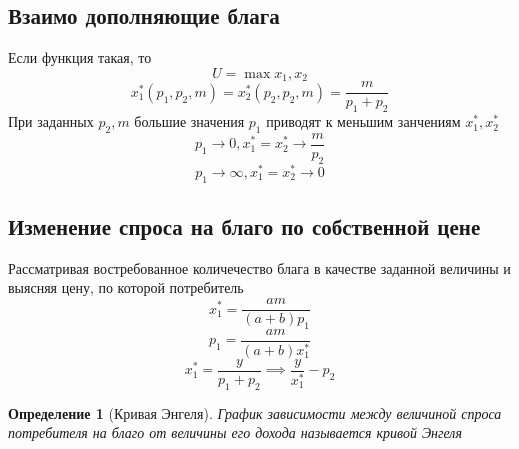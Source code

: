 \documentclass[14pt]{extarticle}
\newtheorem{definition}{Определение}
\begin{document}
 \subsection{Взаимо дополняющие блага }
 Если функция такая, то
 \begin{equation}
	 U = \max{x_1,x_2}
 \end{equation} 
 \begin{equation}
 x_1^{*}(p_1,p_2,m) = x_2^{*}(p_2,p_2,m) = \frac{m}{p_1 + p_2}
 \end{equation} 
 При заданных $p_2,m$ большие значения $p_1$ приводят к меньшим
 занчениям $x_1^{*},x_2^{*}$
 \begin{equation}
 p_1 \to 0, x_1^{*} = x_2^{*} \to \frac{m}{p_2}
 \end{equation} 
 \begin{equation}
 p_1 \to \infty , x_1^{*} = x_2^{*} \to 0
 \end{equation} 
 \subsection{Изменение спроса на благо по собственной цене}
 Рассматривая востребованное количечество блага
 в качестве заданной величины и выясняя цену, по
 которой потребитель
 \begin{equation}
 x_1^{*} = \frac{a m}{(a + b) p_1}
 \end{equation} 
 \begin{equation}
 p_1 = \frac{a m}{(a + b) x_1^{*}}
 \end{equation} 
 \begin{equation}
 x_1^{*} = \frac{y}{p_1 + p_2}  \implies \frac{y}{x_1^{*}} - p_2
 \end{equation} 
 \begin{definition}[Кривая Энгеля]
	 График зависимости 
	 между величиной спроса потребителя на благо
	 от величины его дохода называется
	 кривой Энгеля
 \end{definition}
\end{document}
